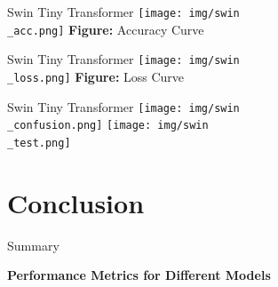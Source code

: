 \documentclass{beamer}
\begin{document}
\begin{frame}{Swin Tiny Transformer}
	\centering
     	\texttt{[image: img/swin\\\_acc.png]}
    	\newline
    	\textbf{Figure:} Accuracy Curve
\end{frame}

\begin{frame}{Swin Tiny Transformer}
	\centering
     	\texttt{[image: img/swin\\\_loss.png]}
    	\newline
    	\textbf{Figure:} Loss Curve
\end{frame}

\begin{frame}{Swin Tiny Transformer}
	\centering
     	\texttt{[image: img/swin\\\_confusion.png]}
    	\texttt{[image: img/swin\\\_test.png]}
\end{frame}


\section{Conclusion}
\begin{frame}{Summary}

    \textbf{Performance Metrics for Different Models}  
    \bigskip
    
    \begin{table}[]
        \centering
{}
    \end{table}

\end{frame}
\end{document}

